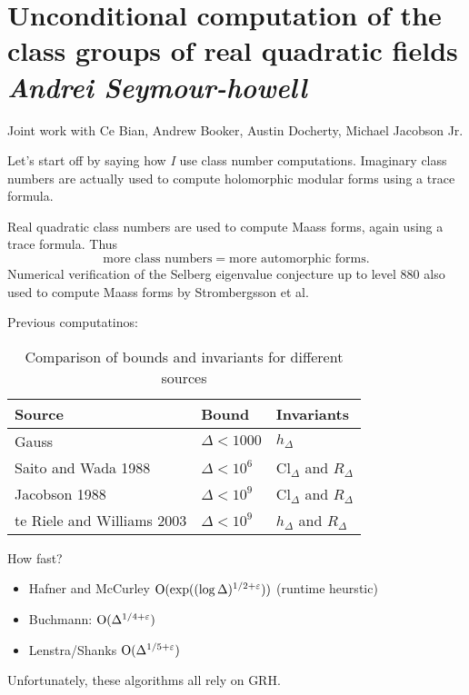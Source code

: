 \documentclass[reqno]{amsart} 
\begin{document}
\section{Unconditional computation of the class groups of real quadratic fields
  \textnormal{\emph{Andrei Seymour-howell}}}

Joint work with Ce Bian, Andrew Booker, Austin Docherty, Michael Jacobson Jr.

Let's start off by saying how \emph{I} use class number computations.  Imaginary class numbers are actually used to compute holomorphic modular forms using a trace formula.

Real quadratic class numbers are used to compute Maass forms, again using a trace formula.  Thus
\begin{equation*}
  \text{more class numbers} = \text{more automorphic forms}.
\end{equation*}
Numerical verification of the Selberg eigenvalue conjecture up to level 880 also used to compute Maass forms by Strombergsson et al.

Previous computatinos:

\begin{table}[h]
  \centering
  \begin{tabular}{|l|l|l|}
    \hline
    \textbf{Source} & \textbf{Bound} & \textbf{Invariants} \\
    \hline
    Gauss & $\Delta < 1000$ & $h_{\Delta}$ \\
    \hline
    Saito and Wada 1988 & $\Delta < 10^6$ & $\mathrm{Cl}_\Delta$ and $R_\Delta$ \\
    \hline
    Jacobson 1988 & $\Delta < 10^9$ & $\mathrm{Cl}_\Delta$ and $R_\Delta$ \\
    \hline
    te Riele and Williams 2003 & $\Delta < 10^9$ & $h_\Delta$ and $R_\Delta$ \\
    \hline
  \end{tabular}
  \caption{Comparison of bounds and invariants for different sources}
  \label{tab:bounds_and_invariants}
\end{table}

How fast?
\begin{itemize}
\item Hafner and McCurley $\operatorname{O}(\exp((\log \Delta)^{1/2 + \varepsilon}))$ (runtime heurstic)
\item Buchmann: $\operatorname{O}(\Delta^{1/4 + \varepsilon})$
\item Lenstra/Shanks $\operatorname{O}(\Delta^{1/5 + \varepsilon})$
\end{itemize}
Unfortunately, these algorithms all rely on GRH.
\end{document}
